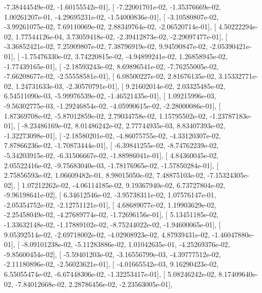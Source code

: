 \documentclass{article}
\begin{document}
         -7.38444549e-02,  -1.60155542e-01],
       [ -7.22001701e-02,  -1.35376669e-02,   1.00261207e-01,
         -4.29695231e-02,  -1.54000836e-01],
       [ -3.10580807e-02,  -3.99261075e-02,   7.69110069e-02,
          2.88349764e-02,  -2.06520714e-01],
       [  4.50222294e-02,   1.77544126e-04,   3.73059418e-02,
         -2.39412873e-02,  -2.29097477e-01],
       [ -3.36852421e-02,   7.25909807e-02,   7.38796919e-02,
          9.94590847e-02,  -2.05390421e-01],
       [ -1.75476330e-02,   3.74220815e-02,  -4.94899241e-02,
          1.26858945e-02,  -1.77439165e-01],
       [ -2.18593243e-02,   8.69896541e-02,  -7.76255005e-02,
         -7.66208677e-02,  -2.55558581e-01],
       [  6.08500227e-02,   2.81676135e-02,   3.15332771e-02,
          1.24731633e-03,  -2.30570791e-01],
       [  9.21602014e-02,   2.03325485e-02,   6.54511090e-03,
         -5.99976539e-02,  -1.46521435e-01],
       [  1.09215996e-03,  -9.56302775e-03,  -1.29246854e-02,
         -4.05990615e-02,  -2.28000086e-01],
       [  1.87369708e-02,  -5.87012859e-02,   2.79034758e-02,
          1.15795502e-02,  -1.23787183e-01],
       [ -8.23486169e-02,   8.01486242e-02,   2.77744935e-03,
          8.83407393e-02,  -1.32273098e-01],
       [ -2.18580201e-02,  -4.86075755e-02,  -4.33120307e-02,
          7.87866236e-02,  -1.70873444e-01],
       [ -6.39841255e-02,  -8.74762239e-02,  -5.34203915e-02,
         -6.31506667e-02,  -1.88986041e-01],
       [  4.84360045e-02,   2.05522416e-02,  -9.75683040e-03,
         -1.78176965e-02,  -1.57850284e-01],
       [  2.75856593e-02,   1.06609482e-01,   8.98015050e-02,
          7.48875103e-02,  -7.15324305e-02],
       [  1.07212262e-02,  -4.06114185e-02,   9.19367940e-02,
          6.73727804e-02,  -9.96198641e-02],
       [  6.34612546e-02,  -3.95738311e-02,   1.07576147e-01,
         -2.05354752e-02,  -2.12751121e-01],
       [  4.68689077e-02,   1.19903629e-02,  -2.25458049e-02,
         -4.27689774e-02,  -1.72696156e-01],
       [  5.13451185e-02,  -1.33632148e-02,  -1.17889102e-02,
         -8.75244022e-02,  -1.94600065e-01],
       [  9.05392514e-02,  -2.69718002e-02,  -4.02908923e-02,
          4.87939431e-02,  -1.46047880e-01],
       [ -8.09101238e-02,  -5.11283886e-02,   1.01042635e-01,
         -4.25269376e-02,  -9.85600454e-02],
       [ -5.59401203e-02,  -3.16556799e-03,  -4.39777512e-02,
         -2.11180896e-02,  -2.56023621e-01],
       [ -4.01665542e-03,   9.16290423e-02,   6.55055474e-02,
         -6.67448306e-02,  -1.32253417e-01],
       [  5.08246242e-02,   8.17409640e-02,  -7.84012668e-02,
          2.28786456e-02,  -2.23563005e-01],
\end{document}
